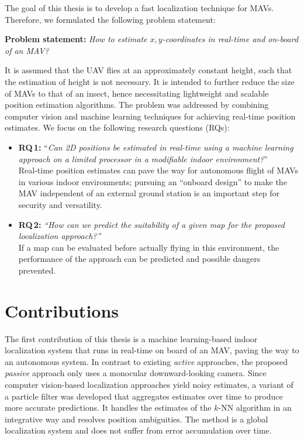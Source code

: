 \documentclass{report}
\begin{document}
The goal of this thesis is to develop a fast localization technique
for MAVs. Therefore, we formulated the following problem statement:

\hspace*{0.5cm}\textbf{Problem statement:} \emph{How to estimate
  $x,y$-coordinates in real-time and \hspace*{0.5cm}on-board of an
  MAV?}

It is assumed that the UAV flies at an approximately constant height,
such that the estimation of height is not necessary. It is intended
to further reduce the size of MAVs to that of an insect, hence
necessitating lightweight and scalable position estimation algorithms.
The problem was addressed by combining computer vision and machine
learning techniques for achieving real-time position estimates. We
focus on the following research questions (RQs):
\begin{itemize}
\item \textbf{RQ\,1:} ``\emph{Can 2D positions be estimated in real-time using a
    machine learning approach on a limited processor in a modifiable
    indoor environment?}''\vspace*{0.05cm}\\
  Real-time position estimates can pave the way for autonomous flight
  of MAVs in various indoor environments; pursuing an ``onboard
  design'' to make the MAV independent of an external ground station
  is an important step for security and versatility.
\item \textbf{RQ\,2:} \emph{``How can we predict the suitability of a
    given map for the proposed localization approach?''}  \vspace*{0.15cm}\\
  If a map can be evaluated before actually flying in this
  environment, the performance of the approach can be predicted and
  possible dangers prevented.
\end{itemize}

\section{Contributions}
\label{sec:contributions}

The first contribution of this thesis is a machine learning-based
indoor localization system that runs in real-time on board of an MAV,
paving the way to an autonomous system. In contrast to existing
\emph{active} approaches, the proposed \emph{passive} approach only
uses a monocular downward-looking camera. Since computer vision-based
localization approaches yield noisy estimates, a variant of a particle
filter was developed that aggregates estimates over time to produce
more accurate predictions. It handles the estimates of the $k$-NN
algorithm in an integrative way and resolves position ambiguities. The
method is a global localization system and does not suffer from error
accumulation over time.
\end{document}
